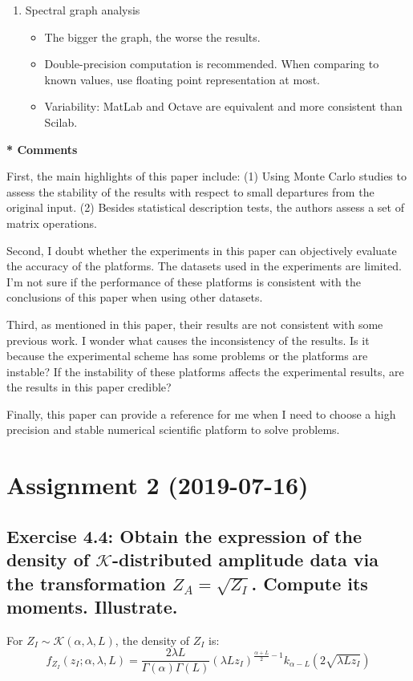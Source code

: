 \documentclass[conference,onecolumn]{IEEEtran}
\begin{document}
\begin{enumerate}
	\item Spectral graph analysis
	\begin{itemize}
		\item The bigger the graph, the worse the results.
		\item Double-precision computation is recommended. When comparing to known values, use floating point representation at most.
		\item Variability: MatLab and Octave are equivalent and more consistent than Scilab. 
	\end{itemize}

\end{enumerate}

\textbf{* Comments}

First, the main highlights of this paper include: (1) Using Monte Carlo studies to assess the stability of the results with respect to small departures from the original input. (2) Besides statistical description tests, the authors assess a set of matrix operations.

Second, I doubt whether the experiments in this paper can objectively evaluate the accuracy of the platforms. The datasets used in the experiments are limited. I'm not sure if the performance of these platforms is consistent with the conclusions of this paper when using other datasets.

Third, as mentioned in this paper, their results are not consistent with some previous work. I wonder what causes the inconsistency of the results. Is it because the experimental scheme has some problems or the platforms are instable? If the instability of these platforms affects the experimental results, are the results in this paper credible?

Finally, this paper can provide a reference for me when I need to choose a high precision and stable numerical scientific platform to solve problems.


\section{Assignment 2 (2019-07-16)}
\subsection{Exercise 4.4: Obtain the expression of the density of $\mathcal K$-distributed amplitude data via the transformation $Z_A=\sqrt{Z_I}$. Compute its moments. Illustrate.}

For $Z_I \sim \mathcal K(\alpha,\lambda,L)$, the density of $Z_I$ is:
\begin{equation}
f_{Z_I}(z_I;\alpha,\lambda,L)=\frac{2\lambda L}{\Gamma(\alpha)\Gamma(L)} (\lambda L z_I)^{\frac{\alpha+L}{2}-1} k_{\alpha-L}(2\sqrt{\lambda L z_I})
\label{eq:ZI_K_dis}
\end{equation}
\end{document}
